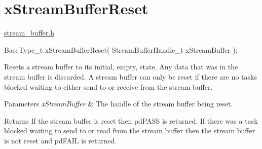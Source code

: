 \hypertarget{group__x_stream_buffer_reset}{}\section{x\+Stream\+Buffer\+Reset}
\label{group__x_stream_buffer_reset}
\mbox{\hyperlink{stream__buffer_8h_source}{stream\+\_\+buffer.\+h}}


\begin{DoxyPre}
BaseType\_t xStreamBufferReset( StreamBufferHandle\_t xStreamBuffer );
\end{DoxyPre}


Resets a stream buffer to its initial, empty, state. Any data that was in the stream buffer is discarded. A stream buffer can only be reset if there are no tasks blocked waiting to either send to or receive from the stream buffer.


\begin{DoxyParams}{Parameters}
{\em x\+Stream\+Buffer} & The handle of the stream buffer being reset.\\
\hline
\end{DoxyParams}
\begin{DoxyReturn}{Returns}
If the stream buffer is reset then pd\+P\+A\+SS is returned. If there was a task blocked waiting to send to or read from the stream buffer then the stream buffer is not reset and pd\+F\+A\+IL is returned. 
\end{DoxyReturn}
